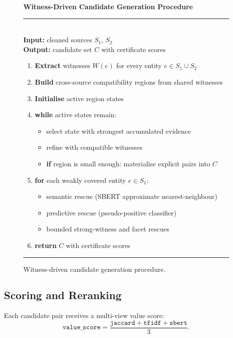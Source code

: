 \documentclass[10pt,twocolumn]{article}
\begin{document}
\begin{figure}[t]
\small
\textbf{Witness-Driven Candidate Generation Procedure}\\[3pt]
\noindent\rule{\columnwidth}{0.4pt}\\[2pt]
\textbf{Input:} cleaned sources $S_1$, $S_2$\\
\textbf{Output:} candidate set $C$ with certificate scores\\[3pt]
\begin{enumerate}[leftmargin=1.4em,topsep=0pt,itemsep=1pt,label=\arabic*.]
  \item \textbf{Extract} witnesses $W(e)$ for every entity $e \in S_1 \cup S_2$
  \item \textbf{Build} cross-source compatibility regions from shared witnesses
  \item \textbf{Initialise} active region states
  \item \textbf{while} active states remain:
    \begin{itemize}[topsep=0pt,itemsep=0pt,leftmargin=1.2em]
      \item select state with strongest accumulated evidence
      \item refine with compatible witnesses
      \item \textbf{if} region is small enough: materialise explicit pairs into $C$
    \end{itemize}
  \item \textbf{for} each weakly covered entity $e \in S_1$:
    \begin{itemize}[topsep=0pt,itemsep=0pt,leftmargin=1.2em]
      \item semantic rescue (SBERT approximate nearest-neighbour)
      \item predictive rescue (pseudo-positive classifier)
      \item bounded strong-witness and facet rescues
    \end{itemize}
  \item \textbf{return} $C$ with certificate scores
\end{enumerate}
\noindent\rule{\columnwidth}{0.4pt}
\caption{Witness-driven candidate generation procedure.}
\label{alg:witnesses}
\end{figure}

\subsection{Scoring and Reranking}

Each candidate pair receives a multi-view value score:
\[
  \texttt{value\_score} = \frac{\texttt{jaccard} +
  \texttt{tfidf} + \texttt{sbert}}{3}.
\]
\end{document}

